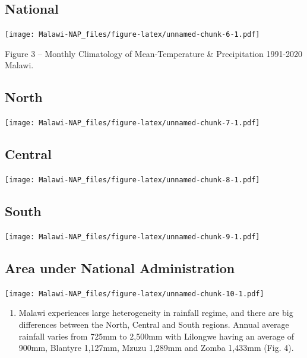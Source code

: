 \documentclass[
]{book}
\providecommand{\tightlist}{%
  \setlength{\itemsep}{0pt}\setlength{\parskip}{0pt}}
\begin{document}
\hypertarget{national}{%
\subsection{National}\label{national}}

\texttt{[image: Malawi-NAP\_files/figure-latex/unnamed-chunk-6-1.pdf]}

Figure 3 -- Monthly Climatology of Mean-Temperature \& Precipitation 1991-2020 Malawi.

\hypertarget{north}{%
\subsection{North}\label{north}}

\texttt{[image: Malawi-NAP\_files/figure-latex/unnamed-chunk-7-1.pdf]}

\hypertarget{central}{%
\subsection{Central}\label{central}}

\texttt{[image: Malawi-NAP\_files/figure-latex/unnamed-chunk-8-1.pdf]}

\hypertarget{south}{%
\subsection{South}\label{south}}

\texttt{[image: Malawi-NAP\_files/figure-latex/unnamed-chunk-9-1.pdf]}

\hypertarget{area-under-national-administration}{%
\subsection{Area under National Administration}\label{area-under-national-administration}}

\texttt{[image: Malawi-NAP\_files/figure-latex/unnamed-chunk-10-1.pdf]}

\begin{enumerate}
\def\labelenumi{\arabic{enumi}.}
\setcounter{enumi}{18}
\tightlist
\item
  Malawi experiences large heterogeneity in rainfall regime, and there are big differences between the North, Central and South regions. Annual average rainfall varies from 725mm to 2,500mm with Lilongwe having an average of 900mm, Blantyre 1,127mm, Mzuzu 1,289mm and Zomba 1,433mm (Fig. 4).
\end{enumerate}
\end{document}
